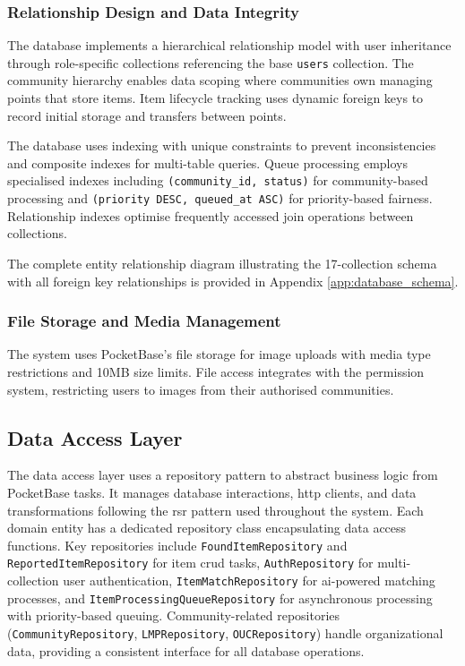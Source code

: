 \subsubsection{Relationship Design and Data Integrity}

The database implements a hierarchical relationship model with user inheritance through role-specific collections referencing the base \texttt{users} collection. The community hierarchy enables data scoping where communities own managing points that store items. Item lifecycle tracking uses dynamic foreign keys to record initial storage and transfers between points.

The database uses indexing with unique constraints to prevent inconsistencies and composite indexes for multi-table queries. Queue processing employs specialised indexes including \texttt{(community\_id, status)} for community-based processing and \texttt{(priority DESC, queued\_at ASC)} for priority-based fairness. Relationship indexes optimise frequently accessed join operations between collections.

The complete entity relationship diagram illustrating the 17-collection schema with all foreign key relationships is provided in Appendix \ref{app:database_schema}.

\subsubsection{File Storage and Media Management}

The system uses PocketBase's file storage for image uploads with media type restrictions and 10MB size limits. File access integrates with the permission system, restricting users to images from their authorised communities.

\subsection{Data Access Layer} \label{subsection:data_access_layer}

The data access layer uses a repository pattern to abstract business logic from PocketBase tasks. It manages database interactions, \ac{http} clients, and data transformations following the \ac{rsr} pattern used throughout the system. Each domain entity has a dedicated repository class encapsulating data access functions. Key repositories include \texttt{FoundItemRepository} and \texttt{ReportedItemRepository} for item \ac{crud} tasks, \texttt{AuthRepository} for multi-collection user authentication, \texttt{ItemMatchRepository} for \ac{ai}-powered matching processes, and \texttt{ItemProcessingQueueRepository} for asynchronous processing with priority-based queuing. Community-related repositories (\texttt{CommunityRepository}, \texttt{LMPRepository}, \texttt{OUCRepository}) handle organizational data, providing a consistent interface for all database operations.

